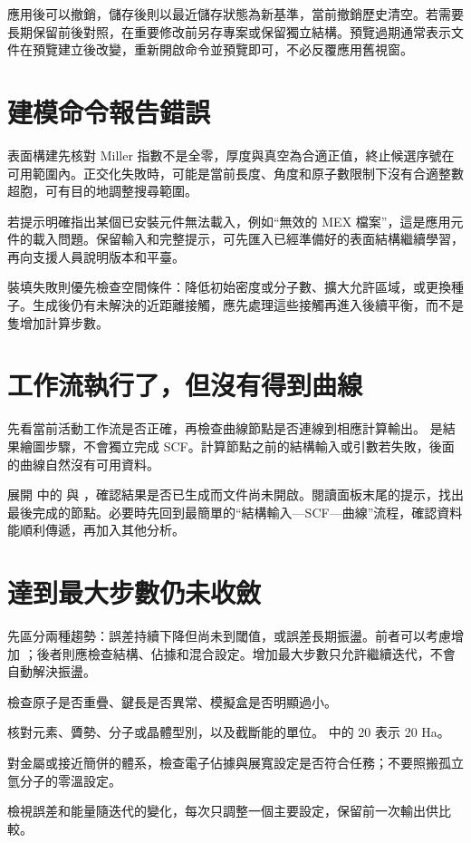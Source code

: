 應用後可以撤銷，儲存後則以最近儲存狀態為新基準，當前撤銷歷史清空。若需要長期保留前後對照，在重要修改前另存專案或保留獨立結構。預覽過期通常表示文件在預覽建立後改變，重新開啟命令並預覽即可，不必反覆應用舊視窗。

\section{建模命令報告錯誤}

表面構建先核對 Miller 指數不是全零，厚度與真空為合適正值，終止候選序號在可用範圍內。正交化失敗時，可能是當前長度、角度和原子數限制下沒有合適整數超胞，可有目的地調整搜尋範圍。

若提示明確指出某個已安裝元件無法載入，例如“無效的 MEX 檔案”，這是應用元件的載入問題。保留輸入和完整提示，可先匯入已經準備好的表面結構繼續學習，再向支援人員說明版本和平臺。

裝填失敗則優先檢查空間條件：降低初始密度或分子數、擴大允許區域，或更換種子。生成後仍有未解決的近距離接觸，應先處理這些接觸再進入後續平衡，而不是隻增加計算步數。

\section{工作流執行了，但沒有得到曲線}

先看當前活動工作流是否正確，再檢查曲線節點是否連線到相應計算輸出。 是結果繪圖步驟，不會獨立完成 SCF。計算節點之前的結構輸入或引數若失敗，後面的曲線自然沒有可用資料。

展開  中的  與 ，確認結果是否已生成而文件尚未開啟。閱讀面板末尾的提示，找出最後完成的節點。必要時先回到最簡單的“結構輸入—SCF—曲線”流程，確認資料能順利傳遞，再加入其他分析。

\section{ 達到最大步數仍未收斂}

先區分兩種趨勢：誤差持續下降但尚未到閾值，或誤差長期振盪。前者可以考慮增加 ；後者則應檢查結構、佔據和混合設定。增加最大步數只允許繼續迭代，不會自動解決振盪。

\begin{steps}
\item 檢查原子是否重疊、鍵長是否異常、模擬盒是否明顯過小。
\item 核對元素、贗勢、分子或晶體型別，以及截斷能的單位。 中的 20 表示 20 Ha。
\item 對金屬或接近簡併的體系，檢查電子佔據與展寬設定是否符合任務；不要照搬孤立氫分子的零溫設定。
\item 檢視誤差和能量隨迭代的變化，每次只調整一個主要設定，保留前一次輸出供比較。
\end{steps}

